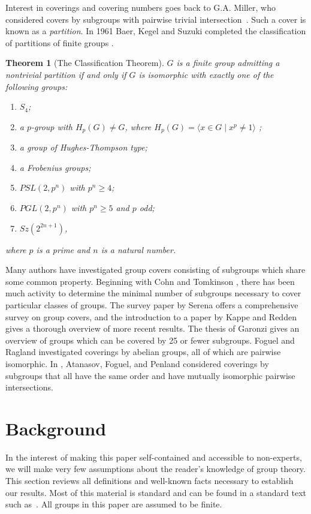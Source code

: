\documentclass{amsart}
\numberwithin{equation} {section}
\newtheorem{theorem}[equation]{Theorem}
\theoremstyle{definition}
\begin{document}
Interest in coverings and covering numbers goes back to  G.A. Miller, who considered covers by subgroups with pairwise trivial intersection~\cite{Mi}. Such a cover is known as a \textit{partition}. In 1961 Baer, Kegel and Suzuki completed the classification of partitions of finite groups \cite{Ba, Ke, Su}.
\begin{theorem} [The Classification Theorem]  $G$ is a finite group admitting a nontrivial partition if and only if $G$ is isomorphic with exactly one of the following groups:
\begin{enumerate}
\item $S_4$;
\item  a $p$-group with $H_p(G) \ne G$, where $H_p(G)=\langle  x\in G \mid x^p\ne1\rangle$ ;
\item  a group of Hughes-Thompson type;
\item  a Frobenius groups;
\item $PSL(2, p^n)$ with $p^n\ge 4$;
\item $PGL(2, p^n)$ with $p^n\ge 5$  and $p$ odd;
\item $Sz(2^{2n+1})$,
\end{enumerate}
where $p$ is a prime and $n$ is a natural number.\end{theorem}



Many authors have investigated group covers consisting of subgroups which share some common property. Beginning with Cohn \cite{Cohn} 
and Tomkinson \cite{Tomkinson},
there has been much activity to determine the minimal number of subgroups necessary to cover particular classes of groups. The survey paper by Serena \cite{Se} offers a comprehensive survey on group covers, and the introduction to a paper by Kappe and Redden \cite{Ka}
gives a thorough overview of more recent results. The thesis of 
Garonzi \cite{AtMost25} gives an overview of groups which can be covered by 25 or fewer subgroups.  Foguel and Ragland \cite{FR} investigated coverings by abelian groups, all of which are pairwise isomorphic. In \cite
{AFP}, Atanasov, Foguel, and Penland considered coverings by subgroups that all have the same order and have mutually isomorphic pairwise intersections. 
\section{Background} 

In the interest of making this paper self-contained and accessible to non-experts, we will make very few assumptions about the reader's knowledge of group theory. This section reviews all definitions and well-known facts necessary to establish our results. Most of this material is standard and can be found in a standard text such as~\cite{Dummit-Foote}.  All groups in this paper are assumed to be finite. 
\end{document}
